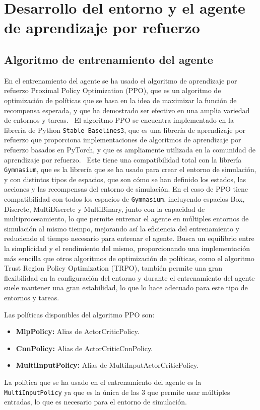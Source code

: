 \section{Desarrollo del entorno y el agente de aprendizaje por refuerzo}

\subsection{Algoritmo de entrenamiento del agente}
En el entrenamiento del agente se ha usado el algoritmo de aprendizaje por refuerzo Proximal Policy Optimization (PPO), que es un algoritmo de optimización de políticas que se basa en la idea de maximizar la función de recompensa esperada, y que ha demostrado ser efectivo en una amplia variedad de entornos y tareas.~\cite{Siboo2023, Yu2022}
El algoritmo PPO se encuentra implementado en la librería de Python \texttt{Stable Baselines3}, que es una librería de aprendizaje por refuerzo que proporciona implementaciones de algoritmos de aprendizaje por refuerzo basados en PyTorch, y que es ampliamente utilizada en la comunidad de aprendizaje por refuerzo.~\cite{Raffin2021}
Este tiene una compatibilidad total con la librería \texttt{Gymnasium}, que es la librería que se ha usado para crear el entorno de simulación, y con distintos tipos de espacios, que son cómo se han definido los estados, las acciones y las recompensas del entorno de simulación. En el caso de PPO tiene compatibilidad con todos los espacios de \texttt{Gymnasium}, incluyendo espacios Box, Discrete, MultiDiscrete y MultiBinary, junto con la capacidad de multiprocesamiento, lo que permite entrenar el agente en múltiples entornos de simulación al mismo tiempo, mejorando así la eficiencia del entrenamiento y reduciendo el tiempo necesario para entrenar el agente.
Busca un equilibrio entre la simplicidad y el rendimiento del mismo, proporcionando una implementación más sencilla que otros algoritmos de optimización de políticas, como el algoritmo Trust Region Policy Optimization (TRPO), también permite una gran flexibilidad en la configuración del entorno y durante el entrenamiento del agente suele mantener una gran estabilidad, lo que lo hace adecuado para este tipo de entornos y tareas.

Las políticas disponibles del algoritmo PPO son:
\begin{itemize}
    \item \textbf{MlpPolicy:} Alias de ActorCriticPolicy.
    \item \textbf{CnnPolicy:} Alias de ActorCriticCnnPolicy.
    \item \textbf{MultiInputPolicy:} Alias de MultiInputActorCriticPolicy.
\end{itemize}
La política que se ha usado en el entrenamiento del agente es la \texttt{MultiInputPolicy} ya que es la única de las 3 que permite usar múltiples entradas, lo que es necesario para el entorno de simulación.

